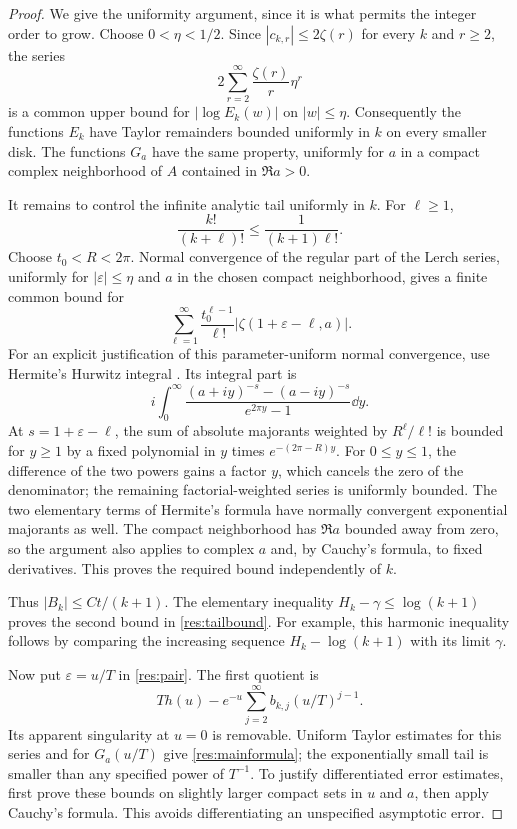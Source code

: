 \begin{proof}
We give the uniformity argument, since it is what permits the integer order
to grow. Choose $0<\eta<1/2$. Since
$|c_{k,r}|\leq2\zeta(r)$ for every $k$ and $r\geq2$, the series
\[
 2\sum_{r=2}^{\infty}\frac{\zeta(r)}r\eta^r
\]
is a common upper bound for $|\log E_k(w)|$ on $|w|\leq\eta$.
Consequently the functions $E_k$ have Taylor remainders bounded uniformly
in $k$ on every smaller disk. The functions $G_a$ have the same property,
uniformly for $a$ in a compact complex neighborhood of $A$ contained in
$\Re a>0$.

It remains to control the infinite analytic tail uniformly in $k$. For
$\ell\geq1$,
\[
 \frac{k!}{(k+\ell)!}\leq\frac1{(k+1)\ell!}.
\]
Choose $t_0<R<2\pi$. Normal convergence of the regular part of the Lerch
series, uniformly for $|\varepsilon|\leq\eta$ and $a$ in the chosen compact
neighborhood, gives a finite common bound for
\[
 \sum_{\ell=1}^{\infty}
 \frac{t_0^{\ell-1}}{\ell!}
       |\zeta(1+\varepsilon-\ell,a)|.
\]
For an explicit justification of this parameter-uniform normal convergence,
use Hermite's Hurwitz integral \cite[25.11.29]{dlmfhurwitz}. Its integral
part is
\[
 i\int_0^\infty
 \frac{(a+iy)^{-s}-(a-iy)^{-s}}{e^{2\pi y}-1}\dd y.
\]
At $s=1+\varepsilon-\ell$, the sum of absolute majorants weighted by
$R^\ell/\ell!$ is bounded for $y\geq1$ by a fixed polynomial in $y$ times
$e^{-(2\pi-R)y}$. For $0\leq y\leq1$, the difference of the two powers
gains a factor $y$, which cancels the zero of the denominator; the remaining
factorial-weighted series is uniformly bounded. The two elementary terms
of Hermite's formula have normally convergent exponential majorants as well.
The compact neighborhood has $\Re a$ bounded away from zero, so the argument
also applies to complex $a$ and, by Cauchy's formula, to fixed derivatives.
This proves the required bound independently of $k$.

Thus $|B_k|\leq Ct/(k+1)$. The elementary inequality
$H_k-\gamma\leq\log(k+1)$ proves the second bound in
\eqref{res:tailbound}. For example, this harmonic inequality follows by
comparing the increasing sequence $H_k-\log(k+1)$ with its limit $\gamma$.

Now put $\varepsilon=u/T$ in \eqref{res:pair}. The first quotient is
\[
 T h(u)-e^{-u}\sum_{j=2}^{\infty}b_{k,j}(u/T)^{j-1}.
\]
Its apparent singularity at $u=0$ is removable. Uniform Taylor estimates
for this series and for $G_a(u/T)$ give \eqref{res:mainformula}; the
exponentially small tail is smaller than any specified power of $T^{-1}$.
To justify differentiated error estimates, first prove these bounds on
slightly larger compact sets in $u$ and $a$, then apply Cauchy's formula.
This avoids differentiating an unspecified asymptotic error.
\end{proof}

